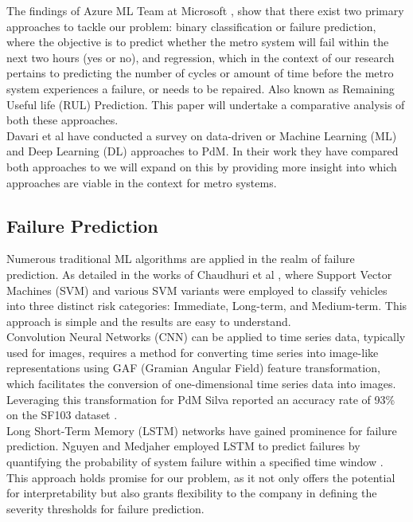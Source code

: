 \documentclass{article}
\begin{document}
The findings of Azure ML Team at Microsoft \cite{AzureML2015}, show that there exist two primary approaches to tackle our problem: binary classification or failure prediction, where the objective is to predict whether the metro system will fail within the next two hours (yes or no), and regression, which in the context of our research pertains to predicting the number of cycles or amount of time before the metro system experiences a failure, or needs to be repaired. Also known as Remaining Useful life (RUL) Prediction. This paper will undertake a comparative analysis of both these approaches. \\

Davari et al \cite{Davari2021} have conducted a survey on data-driven or Machine Learning (ML) and Deep Learning (DL) approaches to PdM. In their work they have compared both approaches to we will expand on this by providing more insight into which approaches are viable in the context for metro systems.

\subsection{Failure Prediction}

Numerous traditional ML algorithms are applied in the realm of failure prediction. As detailed in the works of Chaudhuri et al \cite{chaudhuri2018}, where Support Vector Machines (SVM) and various SVM variants were employed to classify vehicles into three distinct risk categories: Immediate, Long-term, and Medium-term. This approach is simple and the results are easy to understand. \\

Convolution Neural Networks (CNN) can be applied to time series data, typically used for
images, requires a method for converting time series into image-like representations using GAF (Gramian Angular Field) feature transformation, which facilitates the conversion of one-dimensional time series data into images. Leveraging this transformation for PdM Silva reported an accuracy rate of 93\% on the SF103 dataset \cite{Silva2019}. \\

Long Short-Term Memory (LSTM) networks have gained prominence for failure prediction. Nguyen and Medjaher employed LSTM to predict failures by quantifying the probability of system failure within a specified time window \cite{nguyen2019}. This approach holds promise for our problem, as it not only offers the potential for interpretability but also grants flexibility to the company in defining the severity thresholds for failure prediction.
\end{document}
